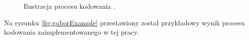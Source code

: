 \documentclass[10pt,polish,a4paper,oneside]{ppfcmthesis}
\begin{document}
\begin{figure}[!ht]
  \centering
  \caption{Ilustracja procesu kodowania \cite{masek}.}
  \label{fig:gaborEncoding}
\end{figure}

Na rysunku \ref{fig:gaborExample} przestawiony został przykładowy wynik procesu kodowania zaimplementowanego
w tej pracy.
\end{document}
